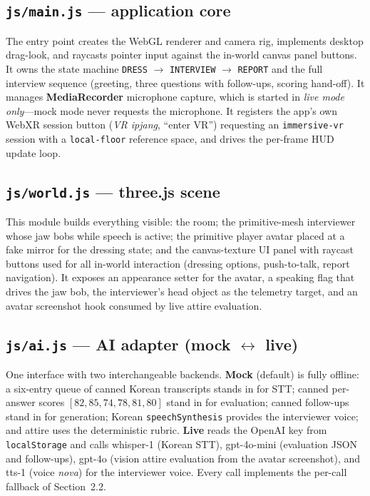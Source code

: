 \documentclass[10pt,a4paper]{article}
\begin{document}
\subsection{\texttt{js/main.js} --- application core}
The entry point creates the WebGL renderer and camera rig, implements desktop drag-look, and raycasts pointer input against the in-world canvas panel buttons. It owns the state machine \texttt{DRESS} $\rightarrow$ \texttt{INTERVIEW} $\rightarrow$ \texttt{REPORT} and the full interview sequence (greeting, three questions with follow-ups, scoring hand-off). It manages \textbf{MediaRecorder} microphone capture, which is started in \emph{live mode only}---mock mode never requests the microphone. It registers the app's own WebXR session button (\emph{VR ipjang}, ``enter VR'') requesting an \texttt{immersive-vr} session with a \texttt{local-floor} reference space, and drives the per-frame HUD update loop.

\subsection{\texttt{js/world.js} --- three.js scene}
This module builds everything visible: the room; the primitive-mesh interviewer whose jaw bobs while speech is active; the primitive player avatar placed at a fake mirror for the dressing state; and the canvas-texture UI panel with raycast buttons used for all in-world interaction (dressing options, push-to-talk, report navigation). It exposes an appearance setter for the avatar, a speaking flag that drives the jaw bob, the interviewer's head object as the telemetry target, and an avatar screenshot hook consumed by live attire evaluation.

\subsection{\texttt{js/ai.js} --- AI adapter (mock $\leftrightarrow$ live)}
One interface with two interchangeable backends. \textbf{Mock} (default) is fully offline: a six-entry queue of canned Korean transcripts stands in for STT; canned per-answer scores $[82, 85, 74, 78, 81, 80]$ stand in for evaluation; canned follow-ups stand in for generation; Korean \texttt{speechSynthesis} provides the interviewer voice; and attire uses the deterministic rubric. \textbf{Live} reads the OpenAI key from \texttt{localStorage} and calls whisper-1 (Korean STT), gpt-4o-mini (evaluation JSON and follow-ups), gpt-4o (vision attire evaluation from the avatar screenshot), and tts-1 (voice \emph{nova}) for the interviewer voice. Every call implements the per-call fallback of Section~2.2.
\end{document}
